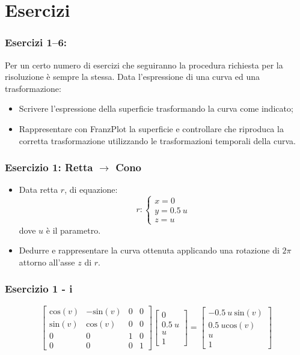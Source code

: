 \documentclass{beamer}
\newcommand{\msin}{\mbox{sin}} %
\newcommand{\mcos}{\mbox{cos}} %
\newcommand{\frnzplt}{FranzPlot }
\begin{document}
\section{Esercizi}
\begin{frame}
\frametitle{Esercizi 1--6:}
Per un certo numero di esercizi che seguiranno la procedura richiesta per la risoluzione \`e sempre la stessa. Data l'espressione di una curva ed una trasformazione:
\begin{itemize}
\item Scrivere l'espressione della superficie trasformando la curva come indicato;
\item Rappresentare con \frnzplt la superficie e controllare che riproduca la corretta trasformazione utilizzando le trasformazioni temporali della curva.
\end{itemize}
\end{frame}
\begin{frame}
\frametitle{Esercizio 1: Retta $\rightarrow$ Cono}
\begin{itemize}
\item Data  retta $r$, di equazione:
\begin{displaymath}
r:
\begin{cases}
x = 0 \\
y = 0.5~u\\
z = u
\end{cases}
\end{displaymath}
dove $u$ \`e il parametro.
\item Dedurre e rappresentare la curva ottenuta applicando una rotazione di $2\pi$ attorno all'asse $z$ di $r$.
\end{itemize}
\end{frame}
\begin{frame}
\frametitle{Esercizio 1 - i}
\begin{displaymath}
\begin{bmatrix}
\mcos(v) &  -\msin(v) & 0 & 0\\
\msin(v) &   \mcos(v) & 0 & 0\\
0 & 0 & 1 & 0\\
0 & 0 & 0 & 1
\end{bmatrix}
\begin{bmatrix}
0 \\ 0.5~u \\ u\\ 1
\end{bmatrix}
= 
\begin{bmatrix}
-0.5~u~\msin(v) \\ 0.5~u\mcos(v) \\ u \\ 1
\end{bmatrix}
\end{displaymath}
\end{frame}
\end{document}
